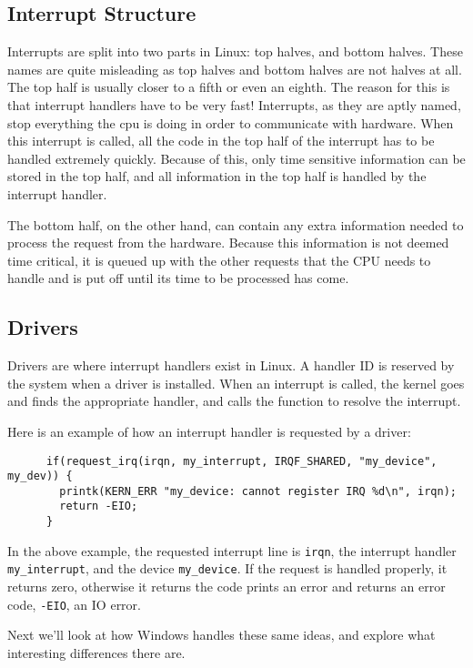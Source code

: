 \documentclass[10pt,letterpaper,onecolumn,draftclsnofoot]{IEEEtran}
\begin{document}
  \subsection{Interrupt Structure}
  Interrupts are split into two parts in Linux: top halves, and bottom halves.
  These names are quite misleading as top halves and bottom halves are not halves
  at all. The top half is usually closer to a fifth or even an eighth. The reason
  for this is that interrupt handlers have to be very fast! Interrupts, as they
  are aptly named, stop everything the cpu is doing in order to communicate with
  hardware. When this interrupt is called, all the code in the top half of the
  interrupt has to be handled extremely quickly. Because of this, only time sensitive
  information can be stored in the top half, and all information in the top half
  is handled by the interrupt handler.

  The bottom half, on the other hand, can contain any extra information needed
  to process the request from the hardware. Because this information is not deemed
  time critical, it is queued up with the other requests that the CPU needs to handle
  and is put off until its time to be processed has come. \cite{robertlove2010}

  \subsection{Drivers}
  Drivers are where interrupt handlers exist in Linux. A handler ID is reserved
  by the system when a driver is installed. When an interrupt is called, the
  kernel goes and finds the appropriate handler, and calls the function to resolve
  the interrupt.

  Here is an example of how an interrupt handler is requested by a driver:
  \begin{lstlisting}
      if(request_irq(irqn, my_interrupt, IRQF_SHARED, "my_device", my_dev)) {
        printk(KERN_ERR "my_device: cannot register IRQ %d\n", irqn);
        return -EIO;
      }
  \end{lstlisting}

  In the above example, the requested interrupt line is \texttt{irqn}, the
  interrupt handler \texttt{my\_interrupt}, and the device \texttt{my\_device}.
  If the request is handled properly, it returns zero, otherwise it returns the
  code prints an error and returns an error code, \texttt{-EIO}, an IO error.
  \cite{robertlove2010}

  Next we'll look at how Windows handles these same ideas, and explore what
  interesting differences there are.
\end{document}
